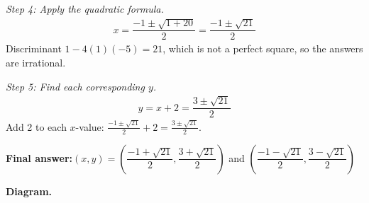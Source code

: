 \documentclass[11pt]{article}
\begin{document}
\textit{Step 4: Apply the quadratic formula.}
\[\begin{gathered}
x = \dfrac{-1 \pm \sqrt{1 + 20}}{2} = \dfrac{-1 \pm \sqrt{21}}{2}
\end{gathered}\]
Discriminant \( 1 - 4(1)(-5) = 21 \), which is not a perfect square, so the answers are irrational.

\textit{Step 5: Find each corresponding \( y \).}
\[\begin{gathered}
y = x + 2 = \dfrac{3 \pm \sqrt{21}}{2}
\end{gathered}\]
Add 2 to each \( x \)-value: \( \tfrac{-1 \pm \sqrt{21}}{2} + 2 = \tfrac{3 \pm \sqrt{21}}{2} \).

\begin{answerbox}
\textbf{Final answer:}\quad \(\displaystyle (x, y) = \left(\dfrac{-1 + \sqrt{21}}{2}, \dfrac{3 + \sqrt{21}}{2}\right)\) and \(\displaystyle \left(\dfrac{-1 - \sqrt{21}}{2}, \dfrac{3 - \sqrt{21}}{2}\right)\)
\end{answerbox}
\textbf{Diagram.}
\end{document}
